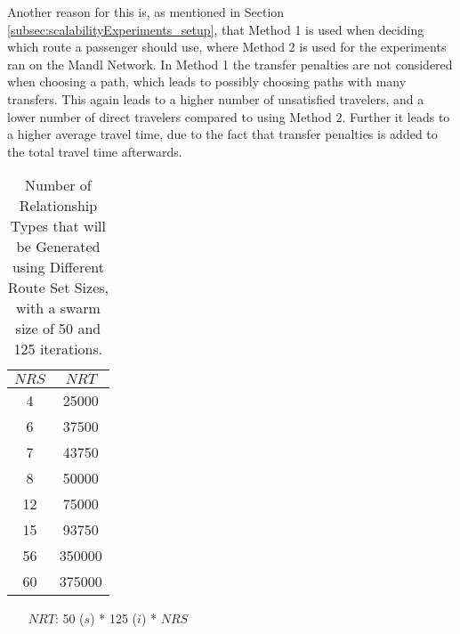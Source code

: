 Another reason for this is, as mentioned in Section \vref{subsec:scalabilityExperiments_setup}, that Method 1 is used when deciding which route a passenger should use, where Method 2 is used for the experiments ran on the Mandl Network. In Method 1 the transfer penalties are not considered when choosing a path, which leads to possibly choosing paths with many transfers. This again leads to a higher number of unsatisfied travelers, and a lower number of direct travelers compared to using Method 2. Further it leads to a higher average travel time, due to the fact that transfer penalties is added to the total travel time afterwards. 


\begin{table}[H]
    \centering
    \hspace*{-1.0cm}
    \begin{tabular}{|c|c|}
        \hline
        \textbf{$NRS$} & \textbf{$NRT$}\\
        \hline
        4 & 25000\\
        \hline
        6 & 37500\\
        \hline
        7 & 43750\\
        \hline
        8 & 50000\\
        \hline
        12 & 75000\\
        \hline
        15 & 93750\\
        \hline
        56 & 350000\\
        \hline
        60 & 375000\\
        \hline
    \end{tabular}
    \caption{Number of Relationship Types that will be Generated using Different Route Set Sizes, with a swarm size of 50 and 125 iterations.}
    \begin{itemize}[noitemsep]
    \item[$NRT$:] 50 ($s$) * 125 ($i$) * $NRS$
    \end{itemize} 
    \label{tabel:numberOfRelationshipTypes}
\end{table} 

